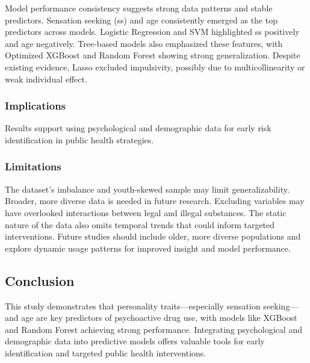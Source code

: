 \documentclass{article}
\begin{document}
Model performance consistency suggests strong data patterns and stable predictors. Sensation seeking (ss) and age consistently emerged as the top predictors across models. Logistic Regression and SVM highlighted ss positively and age negatively. Tree-based models also emphasized these features, with Optimized XGBoost and Random Forest showing strong generalization. Despite existing evidence, Lasso excluded impulsivity, possibly due to multicollinearity or weak individual effect.

\subsubsection*{Implications}
Results support using psychological and demographic data for early risk identification in public health strategies.

\subsubsection*{Limitations}
The dataset’s imbalance and youth-skewed sample may limit generalizability. Broader, more diverse data is needed in future research. Excluding variables may have overlooked interactions between legal and illegal substances. The static nature of the data also omits temporal trends that could inform targeted interventions. Future studies should include older, more diverse populations and explore dynamic usage patterns for improved insight and model performance.

\subsection*{Conclusion}

This study demonstrates that personality traits—especially sensation seeking—and age are key predictors of psychoactive drug use, with models like XGBoost and Random Forest achieving strong performance. Integrating psychological and demographic data into predictive models offers valuable tools for early identification and targeted public health interventions.
\end{document}
